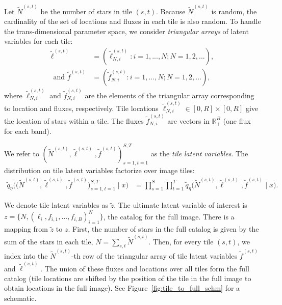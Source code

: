 Let $\tilde N^{(s, t)}$ be the number of stars in tile $(s,t)$.
Because $\tilde N^{(s, t)}$ is random,
the cardinality of the set of locations and fluxes in each tile
is also random.
To handle the trans-dimensional parameter space,
we consider {\itshape triangular arrays} of latent variables
for each tile:
\begin{align}
    \tilde\ell^{(s, t)} &= (\tilde\ell_{N, i}^{(s, t)} : i = 1, ..., N; N = 1, 2, ...), \\
    \text{ and } \tilde f^{(s, t)} &= (\tilde f_{N, i}^{(s, t)} : i = 1, ..., N; N = 1, 2, ...),
\end{align}
where $\tilde\ell_{N, i}^{(s, t)}$ and $\tilde f_{N, i}^{(s, t)}$ are the elements of the triangular array corresponding to location and fluxes, respectively.
Tile locations $\tilde\ell_{N, i}^{(s, t)} \in [0, R]\times[0, R]$ give the location of stars within a tile. The fluxes $\tilde f_{N, i}^{(s, t)}$ are vectors in $\mathbb{R}^B_+$ (one flux for each band).

We refer to $(\tilde N^{(s, t)}, \tilde \ell^{(s, t)}, \tilde f^{(s, t)})_{s=1,t=1}^{S,T}$ as the {\itshape tile latent variables}. The distribution on tile latent variables factorize over image tiles:
\begin{align}
    \tilde q_\eta\big( \big(\tilde N^{(s, t)}, \tilde \ell^{(s, t)}, \tilde f^{(s, t)}\big)_{s=1, t = 1}^{S, T} \mid x\big)
    &=
    \prod_{s = 1}^S \prod_{t=1}^T
    \tilde q_\eta\big(\tilde N^{(s, t)}, \tilde \ell^{(s, t)}, \tilde f^{(s, t)} \mid x\big).
    \label{eq:factorize_patches}
\end{align}

We denote tile latent variables as $\tilde z$.
The ultimate latent variable of interest is $z = \{N, (\ell_i, f_{i,1}, ..., f_{i,B})_{i = 1}^N\}$, the catalog for the full image.
There is a mapping from $\tilde z$ to $z$.
First, the number of stars in the full catalog is given by the sum of the stars in each tile, $N = \sum_{s,t} \tilde N^{(s, t)}$.
Then, for every tile $(s,t)$, we index into the $\tilde N^{(s,t)}$-th row of the triangular array of tile latent variables $\tilde f^{(s,t)}$ and $\tilde \ell^{(s,t)}$.
The union of these fluxes and locations over all tiles form the full catalog (tile locations are shifted by the position of the tile in the full image to obtain locations in the full image).
See Figure~\ref{fig:tile_to_full_schm} for a schematic.



